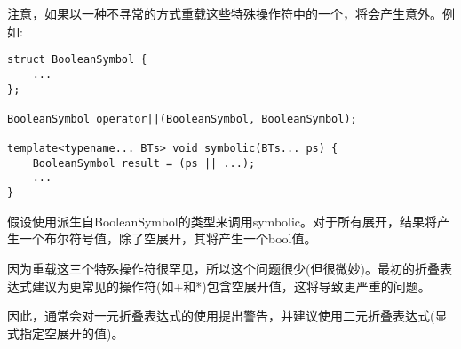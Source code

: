 注意，如果以一种不寻常的方式重载这些特殊操作符中的一个，将会产生意外。例如:

\begin{lstlisting}[style=styleCXX]
struct BooleanSymbol {
	...
};

BooleanSymbol operator||(BooleanSymbol, BooleanSymbol);

template<typename... BTs> void symbolic(BTs... ps) {
	BooleanSymbol result = (ps || ...);
	...
}
\end{lstlisting}

假设使用派生自BooleanSymbol的类型来调用symbolic。对于所有展开，结果将产生一个布尔符号值，除了空展开，其将产生一个bool值。

\begin{tcolorbox}[colback=webgreen!5!white,colframe=webgreen!75!black]
\hspace*{0.75cm}因为重载这三个特殊操作符很罕见，所以这个问题很少(但很微妙)。最初的折叠表达式建议为更常见的操作符(如+和*)包含空展开值，这将导致更严重的问题。
\end{tcolorbox}

因此，通常会对一元折叠表达式的使用提出警告，并建议使用二元折叠表达式(显式指定空展开的值)。






